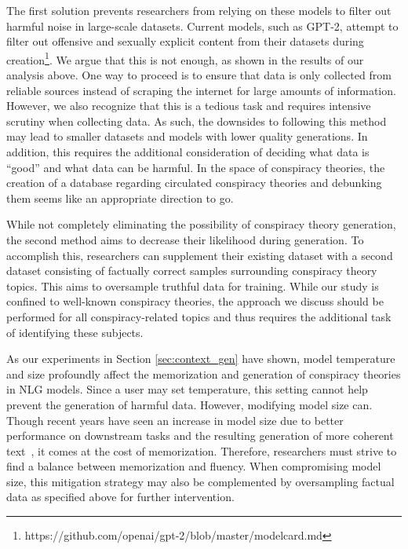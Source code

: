 \documentclass[11pt,a4paper]{article}
\begin{document}
The first solution prevents researchers from relying on these models to filter out harmful noise in large-scale datasets. Current models, such as GPT-2, attempt to filter out offensive and sexually explicit content from their datasets during creation\footnote{https://github.com/openai/gpt-2/blob/master/modelcard.md}. We argue that this is not enough, as shown in the results of our analysis above. One way to proceed is to ensure that data is only collected from reliable sources instead of scraping the internet for large amounts of information. However, we also recognize that this is a tedious task and requires intensive scrutiny when collecting data. As such, the downsides to following this method may lead to smaller datasets and models with lower quality generations. In addition, this requires the additional consideration of deciding what data is ``good'' and what data can be harmful. In the space of conspiracy theories, the creation of a database regarding circulated conspiracy theories and debunking them seems like an appropriate direction to go.

While not completely eliminating the possibility of conspiracy theory generation, the second method aims to decrease their likelihood during generation. To accomplish this, researchers can supplement their existing dataset with a second dataset consisting of factually correct samples surrounding conspiracy theory topics. This aims to oversample truthful data for training. While our study is confined to well-known conspiracy theories, the approach we discuss should be performed for all conspiracy-related topics and thus requires the additional task of identifying these subjects.

As our experiments in Section \ref{sec:context_gen} have shown, model temperature and size profoundly affect the memorization and generation of conspiracy theories in NLG models. Since a user may set temperature, this setting cannot help prevent the generation of harmful data. However, modifying model size can. Though recent years have seen an increase in model size due to better performance on downstream tasks and the resulting generation of more coherent text~\cite{solaiman2019release}, it comes at the cost of memorization. Therefore, researchers must strive to find a balance between memorization and fluency. When compromising model size, this mitigation strategy may also be complemented by oversampling factual data as specified above for further intervention.
\end{document}
